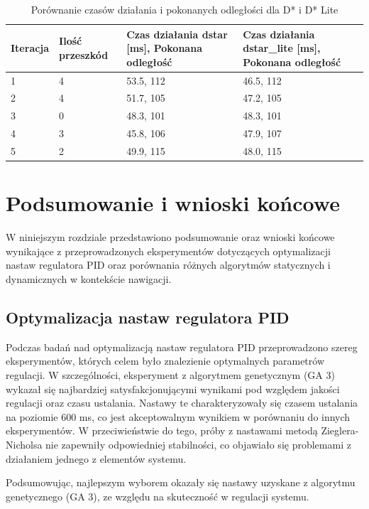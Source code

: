 \documentclass[12pt,twoside]{article}
\begin{document}
\begin{table}[h]
\centering
\begin{tabular}{|p{}|p{}|p{}|p{}|}
\hline
Iteracja & Ilość przeszkód & Czas działania dstar [ms], Pokonana odległość & Czas działania dstar\_lite [ms], Pokonana odległość \\
\hline
1 & 4 &
53.5, 112 & 
46.5, 112 \\
\hline
2 & 4 &
51.7, 105 & 
47.2, 105 \\
\hline
3 & 0 &
48.3, 101 & 
48.3, 101 \\
\hline
4 & 3 &
45.8, 106 & 
47.9, 107 \\
\hline
5 & 2 &
49.9, 115 & 
48.0, 115 \\
\hline
\end{tabular}
\caption{Porównanie czasów działania i pokonanych odległości dla D* i D* Lite}
\label{tab:dstar_vs_dstarlite}
\end{table}




\section{Podsumowanie i wnioski końcowe}
W niniejszym rozdziale przedstawiono podsumowanie oraz wnioski końcowe wynikające z przeprowadzonych eksperymentów dotyczących optymalizacji nastaw regulatora PID oraz porównania różnych algorytmów statycznych i dynamicznych w kontekście nawigacji.

\subsection{Optymalizacja nastaw regulatora PID}
Podczas badań nad optymalizacją nastaw regulatora PID przeprowadzono szereg eksperymentów, których celem było znalezienie optymalnych parametrów regulacji. W szczególności, eksperyment z algorytmem genetycznym (GA 3) wykazał się najbardziej satysfakcjonującymi wynikami pod względem jakości regulacji oraz czasu ustalania. Nastawy te charakteryzowały się czasem ustalania na poziomie 600 ms, co jest akceptowalnym wynikiem w porównaniu do innych eksperymentów. W przeciwieństwie do tego, próby z nastawami metodą Zieglera-Nicholsa nie zapewniły odpowiedniej stabilności, co objawiało się problemami z działaniem jednego z elementów systemu.

Podsumowując, najlepszym wyborem okazały się nastawy uzyskane z algorytmu genetycznego (GA 3), ze względu na skuteczność w regulacji systemu.
\end{document}
